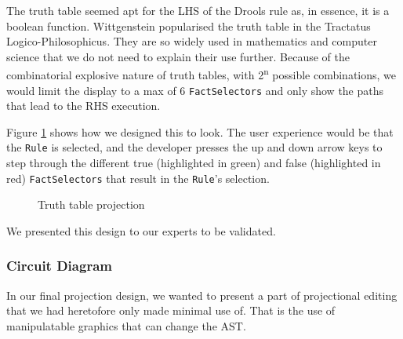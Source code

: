 The truth table seemed apt for the LHS of the Drools rule as, in essence, it is a boolean function.
Wittgenstein popularised the truth table in the Tractatus Logico-Philosophicus\cite{wittgenstein2013tractatus}.
They are so widely used in mathematics and computer science that we do not need to explain their use further.
Because of the combinatorial explosive nature of truth tables, with 2\textsuperscript{n} possible combinations, we would limit the display to a max of 6 \texttt{FactSelectors} and only show the paths that lead to the RHS execution.

Figure \ref{fig:TruthTableProjection} shows how we designed this to look.
The user experience would be that the \texttt{Rule} is selected, and the developer presses the up and down arrow keys to step through the different true (highlighted in green) and false (highlighted in red) \texttt{FactSelectors} that result in the \texttt{Rule}'s selection.

\begin{figure}
    \centering
    \caption{Truth table projection}
    \label{fig:TruthTableProjection}
\end{figure}

We presented this design to our experts to be validated.

\subsubsection{Circuit Diagram}
In our final projection design, we wanted to present a part of projectional editing that we had heretofore only made minimal use of.
That is the use of manipulatable graphics that can change the AST.

